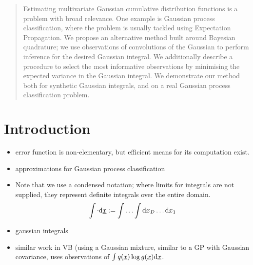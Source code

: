 \documentclass[twoside]{article}
\begin{document}

\begin{abstract}%
Estimating multivariate Gaussian cumulative distribution functions is a problem with broad relevance. One example is Gaussian process classification, where the problem is usually tackled using Expectation Propagation. We propose an alternative method built around Bayesian quadrature; we use observations of convolutions of the Gaussian to perform inference for the desired Gaussian integral. We additionally describe a procedure to select the most informative observations by minimising the expected variance in the Gaussian integral. We demonstrate our method both for synthetic Gaussian integrals, and on a real Gaussian process classification problem. 
\end{abstract}


\section{Introduction}

\begin{itemize}
 \item error function is non-elementary, but efficient means for its computation exist. 
\item approximations for Gaussian process classification \citep{kuss2005assessing,nickisch2008approximations}
\item Note that we use a condensed notation; where limits for integrals are not supplied, they represent definite integrals over the entire domain. 
\begin{equation}
 \int \cdot \mathrm{d} \underline{\smash{x}} := \int \ldots \int \mathrm{d} x_D \ldots \mathrm{d} x_1
\end{equation}
\item gaussian integrals \citep{cunningham2011approximate}
\item similar work in VB \citep{gershman2012nonparametric} (using a Gaussian mixture, similar to a GP with Gaussian covariance, uses observations of $\int q(\underline{\smash{x}}) \log g(\underline{\smash{x}}) \mathrm{d}\underline{\smash{x}}$.
\end{itemize}
\end{document}
